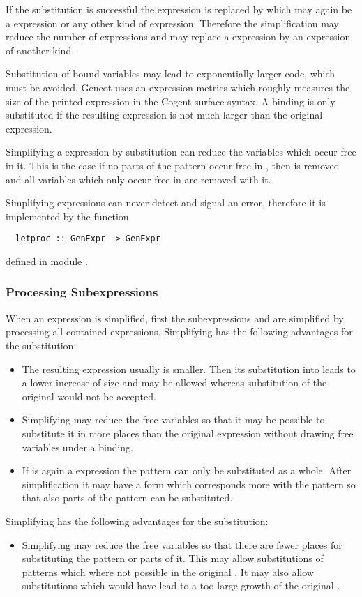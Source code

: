 If the substitution is successful the  expression is replaced by  which may again be a 
expression or any other kind of expression. Therefore the simplification may reduce the number of  expressions
and may replace a  expression by an expression of another kind.

Substitution of bound variables may lead to exponentially larger code, which must be avoided. Gencot uses an expression metrics
which roughly measures the size of the printed expression in the Cogent surface syntax. A binding is only substituted if the 
resulting expression is not much larger than the original  expression.

Simplifying a  expression by substitution can reduce the variables which occur free in it. This is the case if no
parts of the pattern  occur free in , then  is removed and all variables which only occur free
in  are removed with it.

Simplifying  expressions can never detect and signal an error, therefore it is implemented by the function
\begin{verbatim}
  letproc :: GenExpr -> GenExpr
\end{verbatim}
defined in module .

\subsubsection{Processing Subexpressions}

When an expression  is simplified, first the subexpressions  and  are
simplified by processing all contained  expressions. Simplifying  has the following advantages for the 
substitution:
\begin{itemize}
\item The resulting expression usually is smaller. Then its substitution into  leads to a lower increase of
size and may be allowed whereas substitution of the original  would not be accepted.
\item Simplifying may reduce the free variables so that it may be possible to substitute it in more places than
the original expression without drawing free variables under a binding.
\item If  is again a  expression the pattern can only be substituted as a whole. After simplification 
it may have a form which corresponds more with the pattern so that also parts of the pattern can be substituted.
\end{itemize}
Simplifying  has the following advantages for the substitution:
\begin{itemize}
\item Simplifying may reduce the free variables so that there are fewer places for substituting the pattern
or parts of it. This may allow substitutions of patterns which where not possible in the original .
It may also allow substitutions which would have lead to a too large growth of the original .
\end{itemize}

